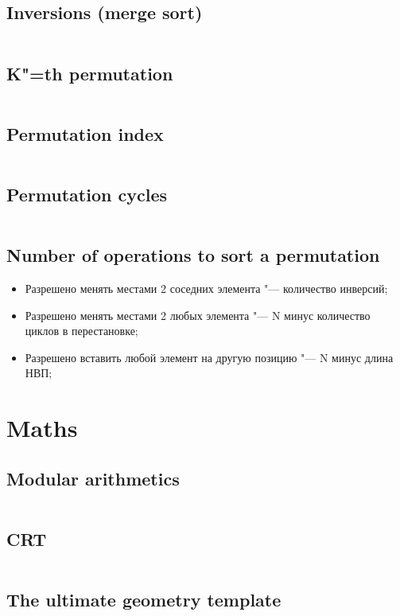 ﻿\documentclass[10pt,twocolumn,oneside]{article}
\begin{document}
\subsection{Inversions (merge sort)}
\inputminted[breaklines]{cpp}{Permutations/inversions.cpp}
\subsection{K"=th permutation}
\inputminted[breaklines]{cpp}{Permutations/k-th permutation.cpp}
\subsection{Permutation index}
\inputminted[breaklines]{python}{Permutations/permutation number.py}
\subsection{Permutation cycles}
\inputminted[breaklines]{cpp}{Permutations/permutation cycles.cpp}
\subsection{Number of operations to sort a permutation}
\begin{itemize}
\item Разрешено менять местами 2 соседних элемента "--- количество инверсий;
\item Разрешено менять местами 2 любых элемента "--- N минус количество циклов в перестановке;
\item Разрешено вставить любой элемент на другую позицию "--- N минус длина НВП;
\end{itemize}

\section{Maths}
\subsection{Modular arithmetics}
\inputminted[breaklines]{cpp}{Maths/modular arithmetics.cpp}
\subsection{CRT}
\inputminted[breaklines]{python}{Maths/crt.py}
\subsection{The ultimate geometry template}
\inputminted[breaklines]{python}{Maths/geometry.py}
\end{document}
